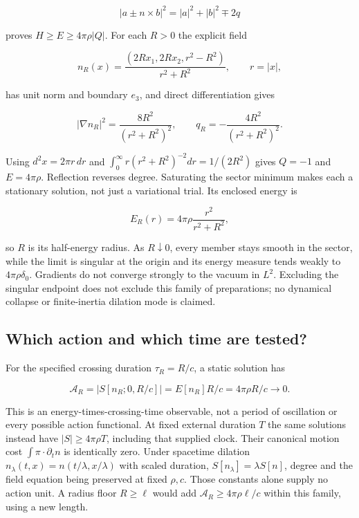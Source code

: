 \documentclass[11pt,a4paper]{article}
\begin{document}
\[|a\pm n\times b|^2=|a|^2+|b|^2\mp2q\]

proves \(H\ge E\ge4\pi\rho|Q|\). For each \(R>0\) the explicit field

\[n_R(x)=\frac{(2Rx_1,2Rx_2,r^2-R^2)}{r^2+R^2},\qquad r=|x|,\]

has unit norm and boundary \(e_3\), and direct differentiation gives

\[|\nabla n_R|^2=\frac{8R^2}{(r^2+R^2)^2},\qquad
q_R=-\frac{4R^2}{(r^2+R^2)^2}.\]

Using \(d^2x=2\pi r\,dr\) and
\(\int_0^\infty r(r^2+R^2)^{-2}dr=1/(2R^2)\) gives \(Q=-1\) and
\(E=4\pi\rho\). Reflection reverses degree. Saturating the sector
minimum makes each a stationary solution, not just a variational trial.
Its enclosed energy is

\[E_R(r)=4\pi\rho\frac{r^2}{r^2+R^2},\]

so \(R\) is its half-energy radius. As \(R\downarrow0\), every member
stays smooth in the sector, while the limit is singular at the origin
and its energy measure tends weakly to \(4\pi\rho\delta_0\). Gradients
do not converge strongly to the vacuum in \(L^2\). Excluding the
singular endpoint does not exclude this family of preparations; no
dynamical collapse or finite-inertia dilation mode is claimed.

\hypertarget{which-action-and-which-time-are-tested}{%
\subsection{Which action and which time are
tested?}\label{which-action-and-which-time-are-tested}}

For the specified crossing duration \(\tau_R=R/c\), a static solution
has

\[\mathcal A_R=|S[n_R;0,R/c]|=E[n_R]R/c=4\pi\rho R/c\longrightarrow0.\]

This is an energy-times-crossing-time observable, not a period of
oscillation or every possible action functional. At fixed external
duration \(T\) the same solutions instead have \(|S|\ge4\pi\rho T\),
including that supplied clock. Their canonical motion cost
\(\int\pi\cdot\partial_tn\) is identically zero. Under spacetime
dilation \(n_\lambda(t,x)=n(t/\lambda,x/\lambda)\) with scaled duration,
\(S[n_\lambda]=\lambda S[n]\), degree and the field equation being
preserved at fixed \(\rho,c\). Those constants alone supply no action
unit. A radius floor \(R\ge\ell\) would add
\(\mathcal A_R\ge4\pi\rho\ell/c\) within this family, using a new
length.
\end{document}
